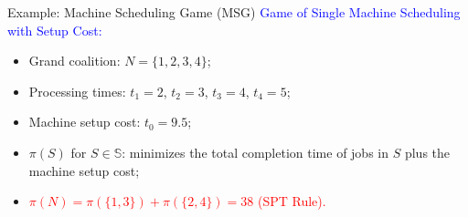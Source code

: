 \documentclass[14pt]{beamer}
\begin{document}
\begin{frame}{Example: Machine Scheduling Game (MSG)}
\small
\textcolor{blue}{Game of Single Machine Scheduling with Setup Cost:}
\vspace{2mm}
	\begin{itemize}
	\justifying
		\item Grand coalition: $N = \big\{ 1,2,3,4 \big\}$;
		\item Processing times: $t_1=2$, $t_2=3$, $t_3=4$, $t_4=5$;
		\item Machine setup cost: $t_0 = 9.5$;
		\item $\pi(S)$ for $S\in \mathbb{S}$:  minimizes the total completion time of jobs in $S$ plus the machine setup cost;
		\item \textcolor{red}{$\pi(N)= \pi(\{1,3\}) + \pi(\{2,4\})= 38$ (SPT Rule).}

\vspace{6pt}
{
\centering
{}
\par
}

\end{itemize}
\end{frame}
\end{document}
